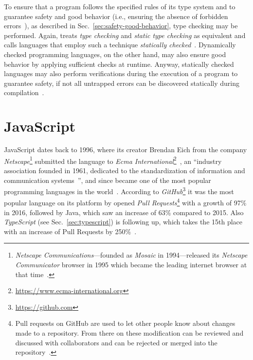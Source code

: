 To ensure that a program follows the specified rules of its type system and to guarantee safety and good behavior (i.e., ensuring the absence of forbidden errors~\cite[p.~97-37]{TypeSystems:Cardelli:2004}), as described in Sec.~\ref{sec:safety-good-behavior}, type checking may be performed. Again, \citeauthor{TypeSystems:Cardelli:2004} treats \emph{type checking} and \emph{static type checking} as equivalent and calls languages that employ such a technique \emph{statically checked}~\cite[p.~97-3]{TypeSystems:Cardelli:2004}. Dynamically checked programming languages, on the other hand, may also ensure good behavior by applying sufficient checks at runtime. Anyway, statically checked languages may also perform verifications during the execution of a program to guarantee safety, if not all untrapped errors can be discovered statically during compilation~\cite[p.~97-4]{TypeSystems:Cardelli:2004}.

\section{JavaScript}
\label{sec:javascript}

JavaScript dates back to 1996, where its creator Brendan Eich from the company \emph{Netscape}\footnote{\emph{Netscape Communications}---founded as \emph{Mosaic} in 1994---released its \emph{Netscape Communicator} browser in 1995 which became the leading internet browser at that time~\cite{HistoryOfNetscape:Cooper:2014}.} submitted the language to \emph{Ecma International}\footnote{\url{https://www.ecma-international.org}}~\cite[p.~28]{ProJavaScriptDevelopment:Odell:2014}, an ``industry association founded in 1961, dedicated to the standardization of information and communication systems~\cite{EcmaInternational:Ecma}'', and since became one of the most popular programming languages in the world~\cite[p.~2]{JavaScriptTheGoodParts:Crockford:2008}. According to \emph{GitHub}\footnote{\url{https://github.com}} it was the most popular language on its platform by opened \emph{Pull Requests}\footnote{Pull requests on GitHub are used to let other people know about changes made to a repository. From there on these modification can be reviewed and discussed with collaborators and can be rejected or merged into the repository~\cite{GitHubPullRequest:GitHub:2014}.} with a growth of 97\% in 2016, followed by Java, which saw an increase of 63\% compared to 2015. Also \emph{TypeScript} (see Sec.~\ref{sec:typescript}) is following up, which takes the 15th place with an increase of Pull Requests by 250\%~\cite{GitHubOctoverse2016:GitHub:2016}.

